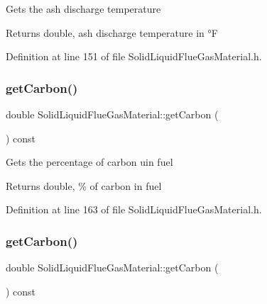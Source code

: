 Gets the ash discharge temperature \begin{DoxyReturn}{Returns}
double, ash discharge temperature in °F 
\end{DoxyReturn}


Definition at line 151 of file Solid\+Liquid\+Flue\+Gas\+Material.\+h.

\mbox{\label{class_solid_liquid_flue_gas_material_a7b8a98111943d30094e2d6950f7f2ec1}} 
\subsubsection{\texorpdfstring{get\+Carbon()}{getCarbon()}\hspace{0.1cm}{\footnotesize\ttfamily [1/3]}}
{\footnotesize\ttfamily double Solid\+Liquid\+Flue\+Gas\+Material\+::get\+Carbon (\begin{DoxyParamCaption}{ }\end{DoxyParamCaption}) const\hspace{0.3cm}{\ttfamily [inline]}}

Gets the percentage of carbon uin fuel \begin{DoxyReturn}{Returns}
double, \% of carbon in fuel 
\end{DoxyReturn}


Definition at line 163 of file Solid\+Liquid\+Flue\+Gas\+Material.\+h.

\mbox{\label{class_solid_liquid_flue_gas_material_a7b8a98111943d30094e2d6950f7f2ec1}} 
\subsubsection{\texorpdfstring{get\+Carbon()}{getCarbon()}\hspace{0.1cm}{\footnotesize\ttfamily [2/3]}}
{\footnotesize\ttfamily double Solid\+Liquid\+Flue\+Gas\+Material\+::get\+Carbon (\begin{DoxyParamCaption}{ }\end{DoxyParamCaption}) const\hspace{0.3cm}{\ttfamily [inline]}}

